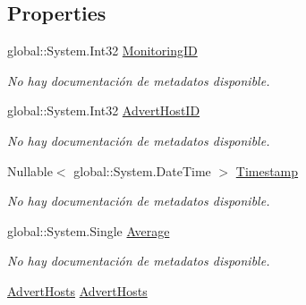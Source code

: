 \subsection*{Properties}
\begin{DoxyCompactItemize}
\item 
global\-::\-System.\-Int32 \hyperlink{class_microsoft_1_1_samples_1_1_kinect_1_1_basic_interactions_1_1_monitorings_aae8415243643475b974fb453546020b8}{Monitoring\-I\-D}
\begin{DoxyCompactList}\small\item\em No hay documentación de metadatos disponible. \end{DoxyCompactList}\item 
global\-::\-System.\-Int32 \hyperlink{class_microsoft_1_1_samples_1_1_kinect_1_1_basic_interactions_1_1_monitorings_adbe1077d9cd0a1f92aad9c315f782b61}{Advert\-Host\-I\-D}
\begin{DoxyCompactList}\small\item\em No hay documentación de metadatos disponible. \end{DoxyCompactList}\item 
Nullable$<$ global\-::\-System.\-Date\-Time $>$ \hyperlink{class_microsoft_1_1_samples_1_1_kinect_1_1_basic_interactions_1_1_monitorings_a9bde1ab19faf8ab1247ab306de23f548}{Timestamp}
\begin{DoxyCompactList}\small\item\em No hay documentación de metadatos disponible. \end{DoxyCompactList}\item 
global\-::\-System.\-Single \hyperlink{class_microsoft_1_1_samples_1_1_kinect_1_1_basic_interactions_1_1_monitorings_a1290a5c6f6eeb1ad9fa356bea431bd06}{Average}
\begin{DoxyCompactList}\small\item\em No hay documentación de metadatos disponible. \end{DoxyCompactList}\item 
\hyperlink{class_microsoft_1_1_samples_1_1_kinect_1_1_basic_interactions_1_1_advert_hosts}{Advert\-Hosts} \hyperlink{class_microsoft_1_1_samples_1_1_kinect_1_1_basic_interactions_1_1_monitorings_a9b67c784742de771b89674a539992ee7}{Advert\-Hosts}

\end{DoxyCompactItemize}
